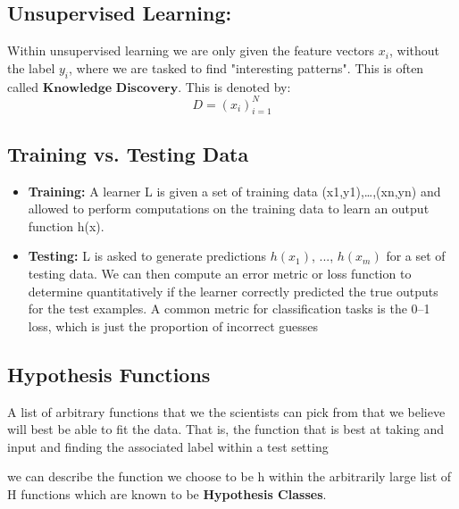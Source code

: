 \documentclass{article}
\begin{document}
    \subsection{Unsupervised Learning:}
        Within unsupervised learning we are only given the feature vectors $x_i$, without the label $y_i$, where we are tasked to find "interesting patterns". This is often called $\textbf{Knowledge Discovery}$. This is denoted by:
        \begin{equation}
            D = {(x_i)}_{i=1}^N
        \end{equation}
    
    \subsection{Training vs. Testing Data}
        \begin{itemize}
            \item 
                \textbf{Training:}
                A learner {L} is given a set of training data {(x1,y1),…,(xn,yn)} and allowed to perform computations on the training data to learn an output function {h(x)}.
                
            \item 
                \textbf{Testing:}
                {L} is asked to generate predictions {$h(x_1)$, ..., $h(x_m)$} for a set of testing data. We can then compute an error metric or loss function to determine quantitatively if the learner correctly predicted the true outputs for the test examples. A common metric for classification tasks is the 0–1 loss, which is just the proportion of incorrect guesses
                
        \end{itemize}
    
    \subsection{Hypothesis Functions}
    A list of arbitrary functions that we the scientists can pick from that we believe will best be able to fit the data. That is, the function that is best at taking and input and finding the associated label within a test setting
    
    we can describe the function we choose to be h within the arbitrarily large list of H functions which are known to be \textbf{Hypothesis Classes}.
    
\end{document}
